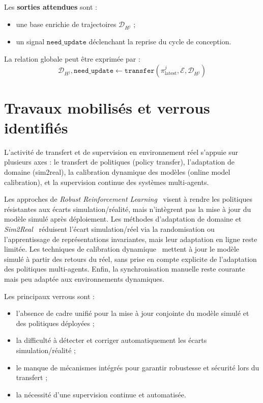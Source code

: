 Les \textbf{sorties attendues} sont :
\begin{itemize}
  \item une base enrichie de trajectoires $\mathcal{D}_{H^j}$ ;
  \item un signal $\texttt{need\_update}$ déclenchant la reprise du cycle de conception.
\end{itemize}

La relation globale peut être exprimée par :
\[
  \mathcal{D}_{H^j}, \texttt{need\_update} \gets \texttt{transfer}(\pi^j_{\text{latest}}, \mathcal{E}, \mathcal{D}_{H^j})
\]

\section{Travaux mobilisés et verrous identifiés}

L'activité de transfert et de supervision en environnement réel s'appuie sur plusieurs axes : le transfert de politiques (policy transfer), l'adaptation de domaine (sim2real), la calibration dynamique des modèles (online model calibration), et la supervision continue des systèmes multi-agents.

Les approches de \textit{Robust Reinforcement Learning}~\cite{pinto2017robust} visent à rendre les politiques résistantes aux écarts simulation/réalité, mais n'intègrent pas la mise à jour du modèle simulé après déploiement. Les méthodes d'adaptation de domaine et \textit{Sim2Real}~\cite{tobin2017domain,ganin2016domain} réduisent l'écart simulation/réel via la randomisation ou l'apprentissage de représentations invariantes, mais leur adaptation en ligne reste limitée. Les techniques de calibration dynamique~\cite{deisenroth2011pilco} mettent à jour le modèle simulé à partir des retours du réel, sans prise en compte explicite de l'adaptation des politiques multi-agents. Enfin, la synchronisation manuelle reste courante mais peu adaptée aux environnements dynamiques.

Les principaux verrous sont :
\begin{itemize}
  \item l'absence de cadre unifié pour la mise à jour conjointe du modèle simulé et des politiques déployées ;
  \item la difficulté à détecter et corriger automatiquement les écarts simulation/réalité ;
  \item le manque de mécanismes intégrés pour garantir robustesse et sécurité lors du transfert ;
  \item la nécessité d'une supervision continue et automatisée.
\end{itemize}

